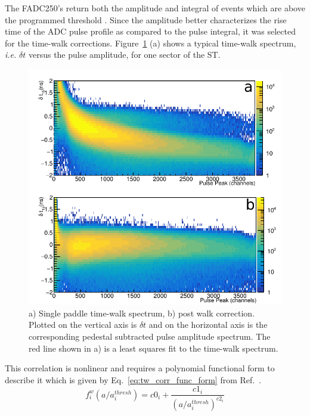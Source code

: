 The FADC250's return both the amplitude and integral of events which are above the programmed threshold \cite{dong_fadc}.  Since the amplitude better characterizes the rise time of the ADC pulse profile as compared to the pulse integral, it was selected for the time-walk corrections.  Figure~\ref{fig:time_walk} (a) shows a typical time-walk spectrum, \textit{i.e.} $\delta t$ versus the pulse amplitude, for one sector of the ST.
	\begin{figure}[!htb]
		\centering
		\includegraphics[width=1.0\columnwidth]{calibration/figs/NIM_TW.pdf}
		\caption{a) Single paddle time-walk spectrum, b) post walk correction.  Plotted on the vertical axis is $\delta t$ and on the horizontal axis is the corresponding pedestal subtracted pulse amplitude spectrum.  The red line shown in a) is a least squares fit to the time-walk spectrum.}
		\label{fig:time_walk}
	\end{figure}
This correlation is nonlinear and requires a polynomial functional form to describe it which is given by Eq.~\ref{eq:tw_corr_func_form} from Ref.~\cite{esmith_bcal}.
	\begin{equation} \label{eq:tw_corr_func_form}
		f^{w}_{i}\left(a/a^{thresh}_{i}\right) = c0_{i} + \frac{c1_{i}}{(a/a^{thresh}_{i})^{c2_{i}}}
	\end{equation}

